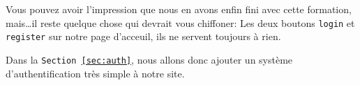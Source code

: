 \begin{figure}[!h]
    \begin{subfigure}[c]{0.42\textwidth}
        \caption{\label{fig:messages_create}}
    \end{subfigure}
    \hspace{0.2cm}
    \begin{subfigure}[c]{0.52\textwidth}
        \caption{\label{fig:messages_error}}
    \end{subfigure}
    \caption{}
\end{figure}

Vous pouvez avoir l'impression que nous en avons enfin fini avec cette formation, mais\ldots il reste quelque chose qui devrait vous chiffoner: Les deux boutons \verb|login| et \verb|register| sur notre page d'acceuil, ils ne servent toujours à rien. 

Dans la \texttt{Section~\ref{sec:auth}}, nous allons donc ajouter un système d'authentification très simple à notre site.
